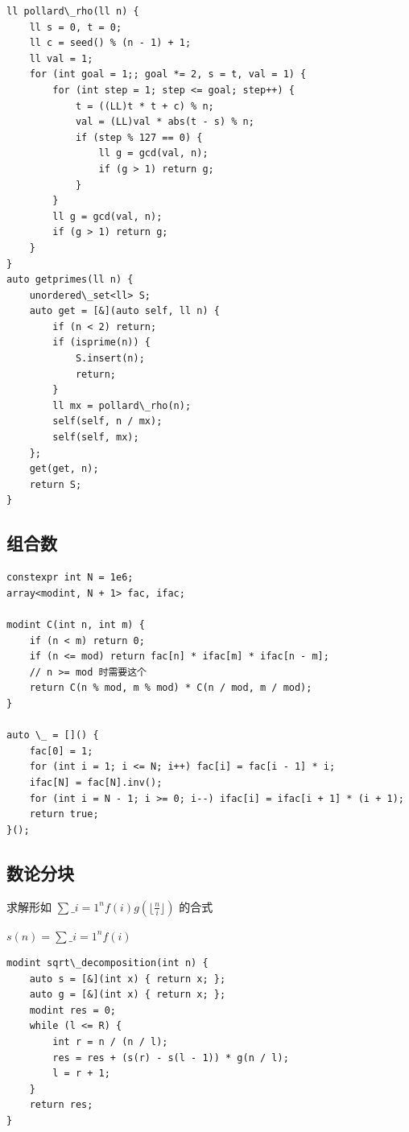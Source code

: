 \documentclass[UTF8]{ctexart}
\begin{document}
\begin{sloppypar}
\begin{lstlisting}[style=cpp]
ll pollard\_rho(ll n) {
    ll s = 0, t = 0;
    ll c = seed() % (n - 1) + 1;
    ll val = 1;
    for (int goal = 1;; goal *= 2, s = t, val = 1) {
        for (int step = 1; step <= goal; step++) {
            t = ((LL)t * t + c) % n;
            val = (LL)val * abs(t - s) % n;
            if (step % 127 == 0) {
                ll g = gcd(val, n);
                if (g > 1) return g;
            }
        }
        ll g = gcd(val, n);
        if (g > 1) return g;
    }
}
auto getprimes(ll n) {
    unordered\_set<ll> S;
    auto get = [&](auto self, ll n) {
        if (n < 2) return;
        if (isprime(n)) {
            S.insert(n);
            return;
        }
        ll mx = pollard\_rho(n);
        self(self, n / mx);
        self(self, mx);
    };
    get(get, n);
    return S;
}
\end{lstlisting}

\subsection{组合数}

\begin{lstlisting}[style=cpp]
constexpr int N = 1e6;
array<modint, N + 1> fac, ifac;

modint C(int n, int m) {
    if (n < m) return 0;
    if (n <= mod) return fac[n] * ifac[m] * ifac[n - m];
    // n >= mod 时需要这个
    return C(n % mod, m % mod) * C(n / mod, m / mod);
}

auto \_ = []() {
    fac[0] = 1;
    for (int i = 1; i <= N; i++) fac[i] = fac[i - 1] * i;
    ifac[N] = fac[N].inv();
    for (int i = N - 1; i >= 0; i--) ifac[i] = ifac[i + 1] * (i + 1);
    return true;
}();
\end{lstlisting}

\subsection{数论分块}

求解形如 $\sum\_{i=1}^{n}f(i)g(\lfloor\frac{n}{i}\rfloor)$ 的合式

$s(n) = \sum\_{i=1}^{n}f(i)$

\begin{lstlisting}[style=cpp]
modint sqrt\_decomposition(int n) {
    auto s = [&](int x) { return x; };
    auto g = [&](int x) { return x; };
    modint res = 0;
    while (l <= R) {
        int r = n / (n / l);
        res = res + (s(r) - s(l - 1)) * g(n / l);
        l = r + 1;
    }
    return res;
}
\end{lstlisting}


\end{sloppypar}
\end{document}
